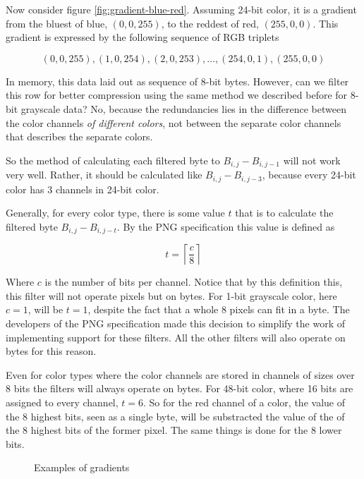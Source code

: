 Now consider figure \ref{fig:gradient-blue-red}. Assuming 24-bit
color, it is a gradient from the bluest of blue, $(0,0,255)$, to the
reddest of red, $(255,0,0)$. This gradient is expressed by the
following sequence of RGB triplets

\begin{equation*}
  (0,0,255), (1,0,254), (2,0,253), \dots, (254,0,1), (255,0,0)
\end{equation*}

In memory, this data laid out as sequence of 8-bit bytes. However, can
we filter this row for better compression using the same method we
described before for 8-bit grayscale data? No, because the
redundancies lies in the difference between the color channels
\textit{of different colors}, not between the separate color channels
that describes the separate colors.

So the method of calculating each filtered byte to $B_{i,j} -
B_{i,j-1}$ will not work very well. Rather, it should be calculated
like $B_{i,j} - B_{i,j-3}$, because every 24-bit color has $3$
channels in 24-bit color.

Generally, for every color type, there is some value $t$ that is to
calculate the filtered byte $B_{i,j} - B_{i,j-t}$. By the PNG
specification this value is defined as

\begin{equation*}
  t = \left\lceil \frac{c}{8} \right\rceil
\end{equation*}

Where $c$ is the number of bits per channel. Notice that by this
definition this, this filter will not operate pixels but on bytes. For
1-bit grayscale color, here $c=1$, will be $t=1$, despite the fact
that a whole $8$ pixels can fit in a byte. The developers of the PNG
specification made this decision to simplify the work of implementing
support for these filters. All the other filters will also operate on
bytes for this reason.

Even for color types where the color channels are stored in channels
of sizes over $8$ bits the filters will always operate on bytes. For
48-bit color, where 16 bits are assigned to every channel, $t=6$. So
for the red channel of a color, the value of the 8 highest bits, seen
as a single byte, will be substracted the value of the of the 8
highest bits of the former pixel. The same things is done for the 8
lower bits.

\begin{figure}[h!]
  \centering


  \caption{Examples of gradients}
\end{figure}

